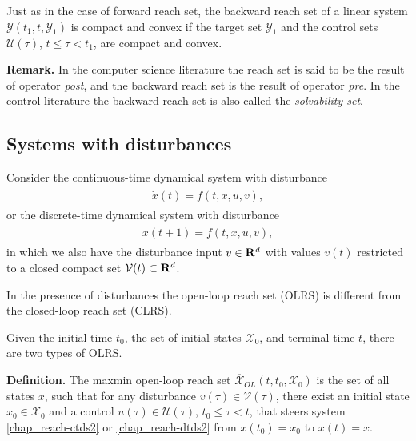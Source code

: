 \documentclass[letterpaper,10pt,english]{sphinxmanual}
\begin{document}
Just as in the case of forward reach set, the backward reach set of a
linear system \({\mathcal Y}(t_1, t, {\mathcal Y}_1)\) is compact
and convex if the target set \({\mathcal Y}_1\) and the control sets
\({\mathcal U}(\tau)\), \(t\leqslant\tau<t_1\), are compact and
convex.

\textbf{Remark.} In the computer science literature the reach set is said to
be the result of operator \emph{post}, and the backward reach set is the
result of operator \emph{pre}. In the control literature the backward reach
set is also called the \emph{solvability set}.


\subsection{Systems with disturbances}
\label{chap_reach:systems-with-disturbances}
Consider the continuous-time dynamical system with disturbance
\label{chap_reach:equation-ctds2}\begin{gather}
\begin{split}\dot{x}(t) = f(t, x, u, v),\end{split}\label{chap_reach-ctds2}
\end{gather}
or the discrete-time dynamical system with disturbance
\label{chap_reach:equation-dtds2}\begin{gather}
\begin{split}x(t+1) = f(t, x, u, v),\end{split}\label{chap_reach-dtds2}
\end{gather}
in which we also have the disturbance input \(v\in{\bf R}^d\) with
values \(v(t)\) restricted to a closed compact set
\({\mathcal V}(t)\subset{\bf R}^d\).

In the presence of disturbances the open-loop reach set (OLRS) is
different from the closed-loop reach set (CLRS).

Given the initial time \(t_0\), the set of initial states
\({\mathcal X}_0\), and terminal time \(t\), there are two types
of OLRS.

\textbf{Definition.} The maxmin open-loop reach set
\(\overline{{\mathcal X}}_{OL}(t, t_0, {\mathcal X}_0)\) is the set
of all states \(x\), such that for any disturbance
\(v(\tau)\in{\mathcal V}(\tau)\), there exist an initial state
\(x_0\in{\mathcal X}_0\) and a control
\(u(\tau)\in{\mathcal U}(\tau)\), \(t_0\leqslant\tau<t\), that
steers system \eqref{chap_reach-ctds2} or \eqref{chap_reach-dtds2} from \(x(t_0)=x_0\) to
\(x(t)=x\).
\end{document}
